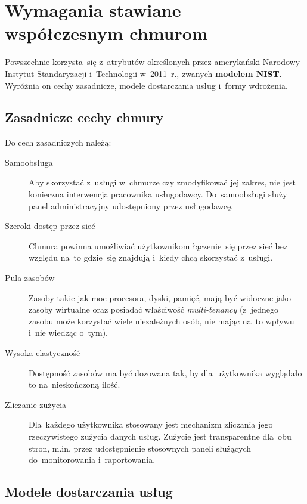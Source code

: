 \documentclass[12pt,a4paper,twoside,titlepage,openright]{book}
\begin{document}
\section{Wymagania stawiane współczesnym chmurom}

Powszechnie korzysta~się z~atrybutów określonych przez amerykański Narodowy Instytut Standaryzacji i~Technologii w~2011~r., zwanych \textbf{modelem NIST}. Wyróżnia on cechy zasadnicze, modele dostarczania usług i~formy wdrożenia. \cite{ccCambridge, azurePackt, nistArticle}

\subsection{Zasadnicze cechy chmury}

Do cech zasadniczych należą:

\begin{description}
\item [Samoobsługa] Aby skorzystać z~usługi w~chmurze czy zmodyfikować jej zakres, nie jest konieczna interwencja pracownika usługodawcy. Do~samoobsługi służy panel administracyjny udostępniony przez usługodawcę.
\item [Szeroki dostęp przez sieć] Chmura powinna umożliwiać użytkownikom łączenie~się przez sieć bez względu na~to gdzie~się znajdują i~kiedy chcą skorzystać z~usługi.
\item [Pula zasobów] Zasoby takie jak moc procesora, dyski, pamięć, mają być widoczne jako zasoby wirtualne oraz posiadać właściwość \textit{multi-tenancy} (z~jednego zasobu może korzystać wiele niezależnych osób, nie mając na~to wpływu i~nie wiedząc o~tym).
\item [Wysoka elastyczność] Dostępność zasobów ma być dozowana tak, by dla~użytkownika wyglądało to na~nieskończoną ilość.
\item [Zliczanie zużycia] Dla~każdego użytkownika stosowany jest mechanizm zliczania jego rzeczywistego zużycia danych usług. Zużycie jest transparentne dla~obu stron, m.in. przez udostępnienie stosownych paneli służących do~monitorowania i~raportowania.
\end{description}

\subsection{Modele dostarczania usług}
\end{document}
